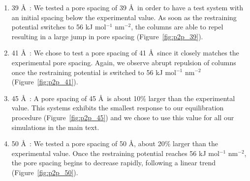 \documentclass{article}
\begin{document}
	\begin{enumerate}

	\item 39 \AA~: We tested a pore spacing of 39 \AA~in order to
	have a test system with an initial spacing below the experimental value. As soon
	as the restraining potential switches to 56 kJ mol$^{-1}$ nm$^{-2}$, the
	columns are able to repel resulting in a large jump in pore spacing
	(Figure~\ref{fig:p2p_39}). %

		\item 41 \AA~: We chose to test a pore spacing of 41 \AA~since
	it closely matches the experimental pore spacing. Again, we observe abrupt
	repulsion of columns once the restraining potential is switched to 56 kJ
	mol$^{-1}$ nm$^{-2}$ (Figure~\ref{fig:p2p_41}). %

		\item 45 \AA~: A pore spacing of 45 \AA~is about 10\% larger
	than the experimental value. This systems exhibits the smallest response to our 
 		equilibration procedure (Figure~\ref{fig:p2p_45}) and we chose to use this
        value for all our simulations in the main text.

	\item 50 \AA~: We tested a pore spacing of 50 \AA, about 20\%
	larger than the experimental value. Once the restraining potential reaches 56
	kJ mol$^{-1}$ nm$^{-2}$, the pore spacing begins to decrease rapidly, following
	a linear trend (Figure~\ref{fig:p2p_50}).
                

\end{enumerate}
\end{document}
